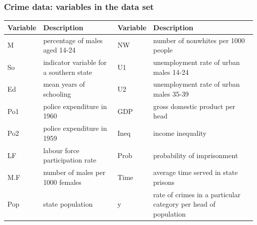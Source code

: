 \documentclass[a4paper]{article}
\begin{document}
\subsubsection{Crime data: variables in the data set}
\begin{table}[H]
	\centering
	\begin{tabularx}{\textwidth}{@{}lXlX@{}}
	\toprule
	\textbf{Variable} & \textbf{Description}                    & \textbf{Variable} & \textbf{Description}                                           \\ \midrule
	M                 & percentage of males aged 14-24          & NW                & number of nonwhites per 1000 people                            \\
	So                & indicator variable for a southern state & U1                & unemployment rate of urban males 14-24                         \\
	Ed                & mean years of schooling                 & U2                & unemployment rate of urban males 35-39                         \\
	Po1               & police expenditure in 1960              & GDP               & gross domestic product per head                                \\
	Po2               & police expenditure in 1959              & Ineq              & income inequality                                              \\
	LF                & labour force participation rate         & Prob              & probability of imprisonment                                    \\
	M.F               & number of males per 1000 females        & Time              & average time served in state prisons                           \\
	Pop               & state population                        & y                 & rate of crimes in a particular category per head of population \\ \bottomrule
	\end{tabularx}
\end{table}
\end{document}
